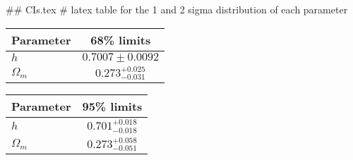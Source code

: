 ## CIs.tex
# latex table for the 1 and 2 sigma distribution of each parameter

\begin{tabular} { l  c}
 Parameter &  68\% limits\\
\hline
{\boldmath$h              $} & $0.7007\pm 0.0092          $\\
{\boldmath$\Omega_m       $} & $0.273^{+0.025}_{-0.031}   $\\
\hline
\end{tabular}

\begin{tabular} { l  c}
 Parameter &  95\% limits\\
\hline
{\boldmath$h              $} & $0.701^{+0.018}_{-0.018}   $\\
{\boldmath$\Omega_m       $} & $0.273^{+0.058}_{-0.051}   $\\
\hline
\end{tabular}
